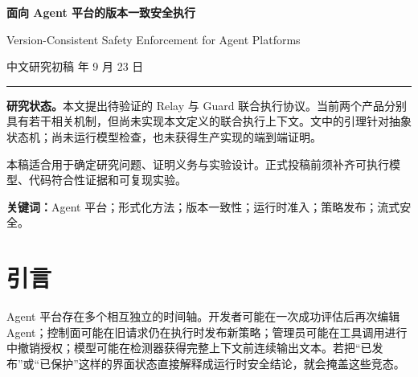 \documentclass[11pt,a4paper]{article}
\theoremstyle{definition}
\begin{document}
\begin{titlepage}
  \thispagestyle{empty}
  \vspace*{29mm}
  {\color{paperblue}\fontsize{23}{31}\selectfont\bfseries
    面向 Agent 平台的版本一致安全执行\par}
  \vspace{8mm}
  {\large Version-Consistent Safety Enforcement for Agent Platforms\par}
  \vspace{13mm}
  {\color{papergray}\large 中文研究初稿  年 9 月 23 日\par}
  \vspace{13mm}
  \noindent\rule{\textwidth}{0.5pt}
  \vspace{6mm}
  \noindent\textbf{研究状态。}本文提出待验证的 Relay 与 Guard 联合执行协议。当前两个产品分别具有若干相关机制，但尚未实现本文定义的联合执行上下文。文中的引理针对抽象状态机；尚未运行模型检查，也未获得生产实现的端到端证明。
  \vfill
  {\small\color{papergray}
  本稿适合用于确定研究问题、证明义务与实验设计。正式投稿前须补齐可执行模型、代码符合性证据和可复现实验。\par}
\end{titlepage}

\begin{abstract}
Agent 平台允许开发者修改定义、针对某一版本运行评估、发布不可变制品，并在异步部署中处理持续到来的请求。保护策略与运行授权又可能独立变化。由此产生一个安全问题：已通过的评估是否仍对应当前发布内容；一个请求是否会混用不同保护版本；授权撤销是否会影响尚未执行的外部操作；流式文本是否会在检查前抵达用户。本文提出一个版本化执行上下文，将 Agent 内容摘要、运行实例和 Guard 保护发布绑定到一次调用，同时在每次外部操作的准入点读取当前授权。我们定义发布证据新鲜性、单次调用的保护版本一致性、外部操作准入授权和流式交付边界四类安全性质，并对全缓冲模式的“检查前不交付”性质给出抽象状态机上的归纳证明。验证计划包括有限状态模型检查、代码轨迹符合性检查、故障注入以及安全性与性能的分离评估。所有保证均以完整拦截和可信执行组件为前提；本文不声称模型输出在语义上必然正确，也不声称检测器没有漏报。
\end{abstract}

\noindent\textbf{关键词：}Agent 平台；形式化方法；版本一致性；运行时准入；策略发布；流式安全。

\section{引言}

Agent 平台存在多个相互独立的时间轴。开发者可能在一次成功评估后再次编辑 Agent；控制面可能在旧请求仍在执行时发布新策略；管理员可能在工具调用进行中撤销授权；模型可能在检测器获得完整上下文前连续输出文本。若把“已发布”或“已保护”这样的界面状态直接解释成运行时安全结论，就会掩盖这些竞态。
\end{document}
